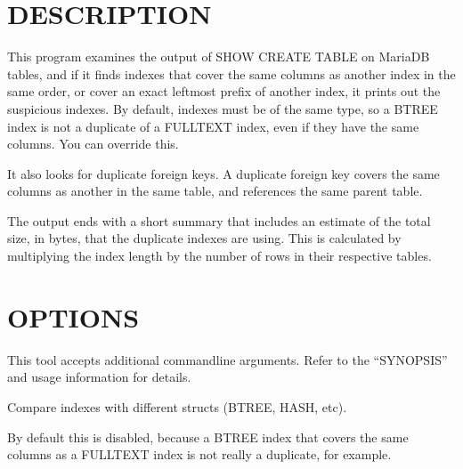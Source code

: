 \documentclass[letterpaper,10pt,english]{sphinxmanual}
\begin{document}
\section{DESCRIPTION}
\label{\detokenize{mariadb-index-checker:description}}
This program examines the output of SHOW CREATE TABLE on MariaDB tables, and if
it finds indexes that cover the same columns as another index in the same
order, or cover an exact leftmost prefix of another index, it prints out
the suspicious indexes.  By default, indexes must be of the same type, so a
BTREE index is not a duplicate of a FULLTEXT index, even if they have the same
columns.  You can override this.

It also looks for duplicate foreign keys.  A duplicate foreign key covers the
same columns as another in the same table, and references the same parent
table.

The output ends with a short summary that includes an estimate of the total
size, in bytes, that the duplicate indexes are using. This is calculated by
multiplying the index length by the number of rows in their respective tables.


\section{OPTIONS}
\label{\detokenize{mariadb-index-checker:options}}
This tool accepts additional command\sphinxhyphen{}line arguments.  Refer to the
“SYNOPSIS” and usage information for details.

\begin{fulllineitems}
\label{\detokenize{mariadb-index-checker:cmdoption-mariadb-index-checker-all-structs}}
Compare indexes with different structs (BTREE, HASH, etc).

By default this is disabled, because a BTREE index that covers the same columns
as a FULLTEXT index is not really a duplicate, for example.

\end{fulllineitems}
\end{document}
